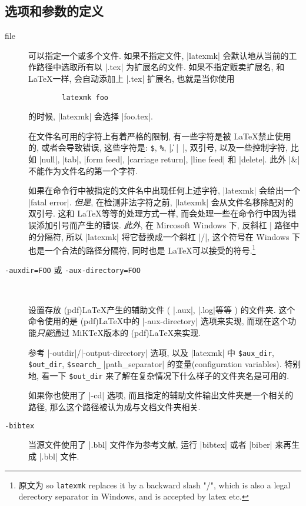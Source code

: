 \documentclass{ctexart}
\begin{document}
\subsection{选项和参数的定义}
	\begin{description}
		\item[file] 可以指定一个或多个文件. 如果不指定文件, |latexmk| 会默认地从当前的工作路径中选取所有以 |.tex| 为扩展名的文件. 如果不指定贩卖扩展名, 和 \LaTeX 一样, 会自动添加上 |.tex| 扩展名, 也就是当你使用
	\begin{Verbatim}
		latexmk foo
	\end{Verbatim} 
		的时候, |latexmk| 会选择 |foo.tex|.

		在文件名可用的字符上有着严格的限制, 有一些字符是被 \LaTeX 禁止使用的, 或者会导致错误, 这些字符是: \texttt{\$}, \texttt{\%}, |\|, |~|, 双引号, 以及一些控制字符, 比如 |null|, |tab|, |form feed|, |carriage return|, |line feed| 和 |delete|. 此外 |&| 不能作为文件名的第一个字符. 

		如果在命令行中被指定的文件名中出现任何上述字符, |latexmk| 会给出一个 |fatal error|. \emph{但是}, 在检测非法字符之前, |latexmk| 会从文件名移除配对的双引号. 这和 \LaTeX 等等的处理方式一样, 而会处理一些在命令行中因为错误添加引号而产生的错误. \emph{此外}, 在 Mircosoft Windows 下, 反斜杠 |\| 是路径中的分隔符, 所以 |latexmk| 将它替换成一个斜杠 |/|, 这个符号在 Windows 下也是一个合法的路径分隔符, 同时也是 \LaTeX 可以接受的符号.\footnote{原文为 so \texttt{latexmk} replaces it by a backward slash "/", which is also a legal derectory separator in Windows, and is accepted by latex etc.}

		\item[\texttt{-auxdir=FOO} 或 \texttt{-aux-directory=FOO}]~
		
		设置存放 (pdf)\LaTeX 产生的辅助文件 ( |.aux|, |.log|等等 ) 的文件夹. 这个命令使用的是 (pdf)\LaTeX 中的 |-aux-directory| 选项来实现, 而现在这个功能\emph{只能}通过 MiK\TeX 版本的 (pdf)\LaTeX 来实现.

		参考 |-outdir|/|-output-directory| 选项, 以及 |latexmk| 中 \verb|$aux_dir|, \verb|$out_dir|, \verb|$search_|
		|path_separator| 的变量(configuration variables). 特别地, 看一下 \verb|$out_dir| 来了解在复杂情况下什么样子的文件夹名是可用的.

		如果你也使用了 |-cd| 选项, 而且指定的辅助文件输出文件夹是一个相关的路径, 那么这个路径被认为成与文档文件夹相关.
		
		\item[\texttt{-bibtex}] 当源文件使用了 |.bbl| 文件作为参考文献, 运行 |bibtex| 或者 |biber| 来再生成 |.bbl| 文件.
		

\end{description}
\end{document}
